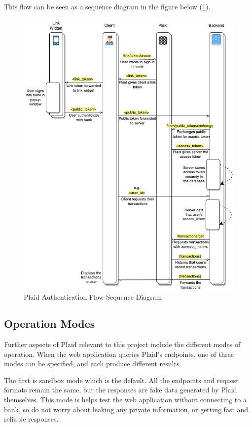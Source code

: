 This flow can be seen as a sequence diagram in the figure below (\ref{fig:plaid_auth_flow}).

\begin{figure}[H]
    \centering
    \includegraphics[width=\textwidth]{images/auth_flow_sequence_diagram.png}
    \caption{Plaid Authentication Flow Sequence Diagram}
    \label{fig:plaid_auth_flow}
\end{figure}

\subsection{Operation Modes}
\label{sec:plaid-operation-modes}
Further aspects of Plaid relevant to this project include the different modes of operation. When the web application queries Plaid's endpoints, one of three modes can be specified, and each produce different results.

The first is sandbox mode which is the default. All the endpoints and request formats remain the same, but the responses are fake data generated by Plaid themselves. This mode is helps test the web application without connecting to a bank, so do not worry about leaking any private information, or getting fast and reliable responses.

